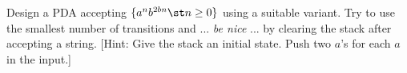 Design a PDA accepting $\{ a^n b^{2bn} \st n \geq 0 \}$ using a suitable
variant.
Try to use the smallest number of transitions and ... \textit{ be nice} ...
by clearing the stack after accepting a string.
[Hint: Give the stack an initial state.
Push two $a$'s for each $a$ in the input.]
